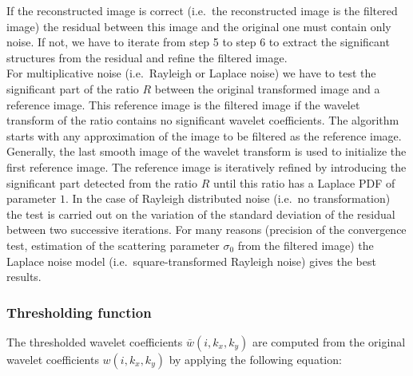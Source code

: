 \begin{itemize}
If the reconstructed image is correct (i.e.\ the 
reconstructed image is the filtered image) the residual between 
this image and the original one must contain only noise.  If not, 
we have to iterate from step 5 to step 6  to extract the 
significant structures from the residual and refine the filtered image. \\

For multiplicative noise (i.e.\ Rayleigh or Laplace noise) 
we have to test the significant part of the ratio $R$ between the 
original transformed image and a reference image. 
This reference image is the filtered image if the wavelet transform 
of the ratio contains no significant wavelet coefficients. 
The algorithm starts with any approximation of the image to be filtered 
as the reference image. Generally, the last smooth image of the 
wavelet transform is used to initialize the first reference image. 
The reference image is iteratively refined by introducing the significant
part detected from the ratio $R$ until this  ratio has a  Laplace PDF 
of parameter $1$. In the case of Rayleigh distributed noise (i.e.\
no transformation) the test is carried out on the variation of the standard 
deviation of the residual between two successive iterations. 
For many reasons (precision of the convergence test, estimation of 
the scattering parameter $\sigma_0$ from the filtered image) the 
Laplace noise model (i.e.\ square-transformed Rayleigh noise) gives
the best results.  

\subsubsection{Thresholding function}

The thresholded wavelet coefficients $\bar{w}(i,k_x,k_y)$ are 
computed from the original wavelet coefficients ${w}(i,k_x,k_y)$ by 
applying the following equation: 


\end{itemize}
